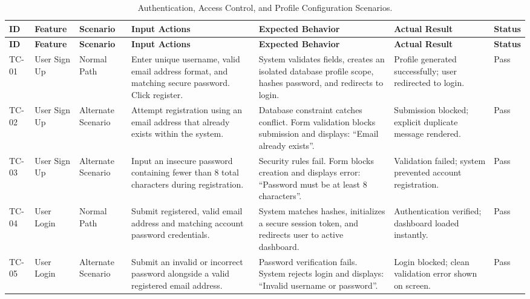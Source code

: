 \begingroup
\setlength{\tabcolsep}{3pt}
\renewcommand{\arraystretch}{1.3}
\begin{longtable}{|p{0.9cm}|>{\raggedright\arraybackslash}p{1.7cm}|>{\raggedright\arraybackslash}p{1.5cm}|>{\raggedright\arraybackslash}p{3.3cm}|>{\raggedright\arraybackslash}p{3.3cm}|>{\raggedright\arraybackslash}p{1.9cm}|>{\raggedright\arraybackslash}p{1.2cm}|}
	\caption{Authentication, Access Control, and Profile Configuration Scenarios.}
	\label{tab:tc_auth}\\
	\hline
	\textbf{ID} & \textbf{Feature} & \textbf{Scenario} & \textbf{Input Actions} & \textbf{Expected Behavior} & \textbf{Actual Result} & \textbf{Status} \\ \hline
	\endfirsthead
	\hline
	\textbf{ID} & \textbf{Feature} & \textbf{Scenario} & \textbf{Input Actions} & \textbf{Expected Behavior} & \textbf{Actual Result} & \textbf{Status} \\ \hline
	\endhead
	TC-01 & User Sign Up & Normal Path & Enter unique username, valid email address format, and matching secure password. Click register. & System validates fields, creates an isolated database profile scope, hashes password, and redirects to login. & Profile generated successfully; user redirected to login. & Pass \\ \hline
	TC-02 & User Sign Up & Alternate Scenario & Attempt registration using an email address that already exists within the system. & Database constraint catches conflict. Form validation blocks submission and displays: ``Email already exists''. & Submission blocked; explicit duplicate message rendered. & Pass \\ \hline
	TC-03 & User Sign Up & Alternate Scenario & Input an insecure password containing fewer than 8 total characters during registration. & Security rules fail. Form blocks creation and displays error: ``Password must be at least 8 characters''. & Validation failed; system prevented account registration. & Pass \\ \hline
	TC-04 & User Login & Normal Path & Submit registered, valid email address and matching account password credentials. & System matches hashes, initializes a secure session token, and redirects user to active dashboard. & Authentication verified; dashboard loaded instantly. & Pass \\ \hline
	TC-05 & User Login & Alternate Scenario & Submit an invalid or incorrect password alongside a valid registered email address. & Password verification fails. System rejects login and displays: ``Invalid username or password''. & Login blocked; clean validation error shown on screen. & Pass \\ \hline
\end{longtable}
\endgroup

